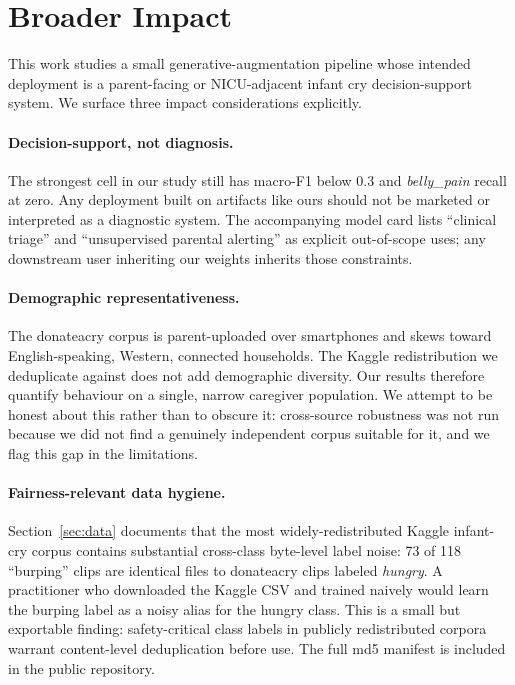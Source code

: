 \documentclass[10pt]{article}
\begin{document}
\section{Broader Impact}\label{sec:impact}
This work studies a small generative-augmentation pipeline whose intended deployment is a parent-facing or NICU-adjacent infant cry decision-support system. We surface three impact considerations explicitly.

\paragraph{Decision-support, not diagnosis.} The strongest cell in our study still has macro-F1 below 0.3 and \textit{belly\_pain} recall at zero. Any deployment built on artifacts like ours should not be marketed or interpreted as a diagnostic system. The accompanying model card lists ``clinical triage'' and ``unsupervised parental alerting'' as explicit out-of-scope uses; any downstream user inheriting our weights inherits those constraints.

\paragraph{Demographic representativeness.} The donateacry corpus is parent-uploaded over smartphones and skews toward English-speaking, Western, connected households. The Kaggle redistribution we deduplicate against does not add demographic diversity. Our results therefore quantify behaviour on a single, narrow caregiver population. We attempt to be honest about this rather than to obscure it: cross-source robustness was not run because we did not find a genuinely independent corpus suitable for it, and we flag this gap in the limitations.

\paragraph{Fairness-relevant data hygiene.} Section~\ref{sec:data} documents that the most widely-redistributed Kaggle infant-cry corpus contains substantial cross-class byte-level label noise: 73 of 118 ``burping'' clips are identical files to donateacry clips labeled \textit{hungry}. A practitioner who downloaded the Kaggle CSV and trained naively would learn the burping label as a noisy alias for the hungry class. This is a small but exportable finding: safety-critical class labels in publicly redistributed corpora warrant content-level deduplication before use. The full md5 manifest is included in the public repository.
\end{document}

